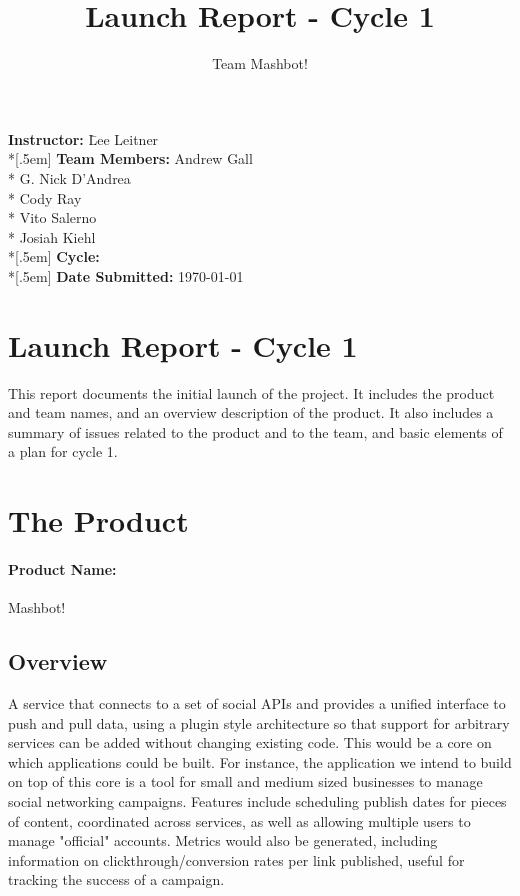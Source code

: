 \documentclass{article}
\title{Launch Report - Cycle 1}
\author{Team Mashbot!}
\begin{document}
\maketitle
\thispagestyle{empty}
\vfill
\begin{tabbing}
\noindent
\textbf{Instructor:} \hspace{3em} \= Lee Leitner \\*[.5em]
\textbf{Team Members:} \> Andrew Gall \\*
\> G. Nick D'Andrea \\*
\> Cody Ray \\*
\> Vito Salerno \\*
\> Josiah Kiehl \\*[.5em]
\textbf{Cycle:}   \\*[.5em]
\textbf{Date Submitted:} \> \today  \\
\end{tabbing}
\cleardoublepage

\section*{Launch Report - Cycle 1}

This report documents the initial launch of the project.  It includes the product and team names, and an overview description of the product.  It also includes a summary of issues related to the product and to the team, and basic elements of a plan for cycle 1.

\section*{The Product}

\paragraph*{Product Name:} Mashbot!

\subsection*{Overview}

A service that connects to a set of social APIs and provides a unified
interface to push and pull data, using a plugin style architecture so
that support for arbitrary services can be added without changing
existing code.  This would be a core on which applications could be
built.  For instance, the application we intend to build on top of
this core is a tool for small and medium sized businesses to manage
social networking campaigns. Features include scheduling publish dates
for pieces of content, coordinated across services, as well as
allowing multiple users to manage "official" accounts.  Metrics would
also be generated, including information on clickthrough/conversion
rates per link published, useful for tracking the success of a
campaign.
\end{document}
